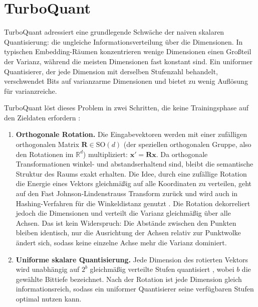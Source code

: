\section{TurboQuant}
\label{sec:grundlagen_turboquant}
%
TurboQuant \cite{zandieh_2025_turboquant} adressiert eine grundlegende Schwäche der naiven skalaren Quantisierung: die ungleiche Informationsverteilung über die Dimensionen.
In typischen Embedding-Räumen konzentrieren wenige Dimensionen einen Großteil der Varianz, während die meisten Dimensionen fast konstant sind.
Ein uniformer Quantisierer, der jede Dimension mit derselben Stufenzahl behandelt, verschwendet Bits auf varianzarme Dimensionen und bietet zu wenig Auflösung für varianzreiche.
\par
TurboQuant löst dieses Problem in zwei Schritten, die keine Trainingsphase auf den Zieldaten erfordern \cite{zandieh_2025_turboquant}:
\begin{enumerate}
  \item \textbf{Orthogonale Rotation.}
Die Eingabevektoren werden mit einer zufälligen orthogonalen Matrix $\mathbf{R} \in \text{SO}(d)$ (der speziellen orthogonalen Gruppe, also den Rotationen im $\mathbb{R}^d$) multipliziert:
$\mathbf{x}' = \mathbf{R}\mathbf{x}$.
Da orthogonale Transformationen winkel- und abstandserhaltend sind, bleibt die semantische Struktur des Raums exakt erhalten.
Die Idee, durch eine zufällige Rotation die Energie eines Vektors gleichmäßig auf alle Koordinaten zu verteilen, geht auf den Fast Johnson-Lindenstrauss Transform zurück \cite{ailon_2009_fjlt} und wird auch in Hashing-Verfahren für die Winkeldistanz genutzt \cite{andoni_2015_lsh}.
Die Rotation dekorreliert jedoch die Dimensionen und verteilt die Varianz gleichmäßig über alle Achsen.
Das ist kein Widerspruch: Die Abstände zwischen den Punkten bleiben identisch, nur die Ausrichtung der Achsen relativ zur Punktwolke ändert sich, sodass keine einzelne Achse mehr die Varianz dominiert.
  \item \textbf{Uniforme skalare Quantisierung.}
Jede Dimension des rotierten Vektors wird unabhängig auf $2^b$ gleichmäßig verteilte Stufen quantisiert \cite{gray_1998_quantization}, wobei $b$ die gewählte Bittiefe bezeichnet.
Nach der Rotation ist jede Dimension gleich informationsreich, sodass ein uniformer Quantisierer seine verfügbaren Stufen optimal nutzen kann.
\end{enumerate}
%
